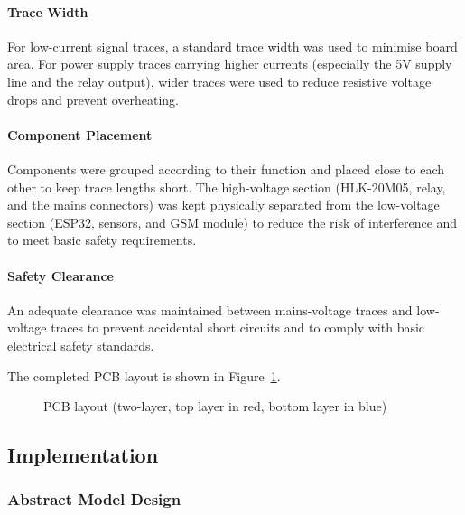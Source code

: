 \documentclass{article}
\begin{document}
\paragraph{Trace Width}

For low-current signal traces, a standard trace width was used to minimise board area. For power supply traces carrying higher currents (especially the 5V supply line and the relay output), wider traces were used to reduce resistive voltage drops and prevent overheating.

\paragraph{Component Placement}

Components were grouped according to their function and placed close to each other to keep trace lengths short. The high-voltage section (HLK-20M05, relay, and the mains connectors) was kept physically separated from the low-voltage section (ESP32, sensors, and GSM module) to reduce the risk of interference and to meet basic safety requirements.

\paragraph{Safety Clearance}

An adequate clearance was maintained between mains-voltage traces and low-voltage traces to prevent accidental short circuits and to comply with basic electrical safety standards.

The completed PCB layout is shown in Figure~\ref{fig:pcb}.

\begin{figure}[H]
    \centering
    \caption{PCB layout (two-layer, top layer in red, bottom layer in blue)}
    \label{fig:pcb}
\end{figure}

\subsection{Implementation}

\subsubsection{Abstract Model Design}
\end{document}
